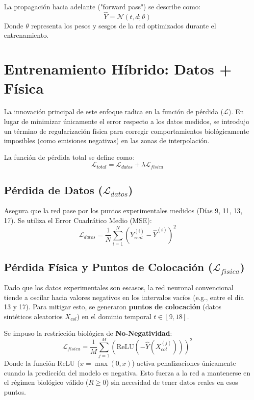 La propagación hacia adelante ("forward pass") se describe como:
\begin{equation}
    \hat{Y} = \mathcal{N}(t, d; \theta)
\end{equation}
Donde $\theta$ representa los pesos y sesgos de la red optimizados durante el entrenamiento.

\section{Entrenamiento Híbrido: Datos + Física}

La innovación principal de este enfoque radica en la función de pérdida ($\mathcal{L}$). En lugar de minimizar únicamente el error respecto a los datos medidos, se introdujo un término de regularización física para corregir comportamientos biológicamente imposibles (como emisiones negativas) en las zonas de interpolación.

La función de pérdida total se define como:
\begin{equation}
    \mathcal{L}_{total} = \mathcal{L}_{datos} + \lambda \mathcal{L}_{fisica}
\end{equation}

\subsection{Pérdida de Datos ($\mathcal{L}_{datos}$)}
Asegura que la red pase por los puntos experimentales medidos (Días 9, 11, 13, 17). Se utiliza el Error Cuadrático Medio (MSE):
\begin{equation}
    \mathcal{L}_{datos} = \frac{1}{N} \sum_{i=1}^{N} (Y_{real}^{(i)} - \hat{Y}^{(i)})^2
\end{equation}

\subsection{Pérdida Física y Puntos de Colocación ($\mathcal{L}_{fisica}$)}
Dado que los datos experimentales son escasos, la red neuronal convencional tiende a oscilar hacia valores negativos en los intervalos vacíos (e.g., entre el día 13 y 17). Para mitigar esto, se generaron \textbf{puntos de colocación} (datos sintéticos aleatorios $X_{col}$) en el dominio temporal $t \in [9, 18]$.

Se impuso la restricción biológica de \textbf{No-Negatividad}:
\begin{equation}
    \mathcal{L}_{fisica} = \frac{1}{M} \sum_{j=1}^{M} \left( \text{ReLU}(-\hat{Y}(X_{col}^{(j)})) \right)^2
\end{equation}
Donde la función ReLU ($x = \max(0, x)$) activa penalizaciones únicamente cuando la predicción del modelo es negativa. Esto fuerza a la red a mantenerse en el régimen biológico válido ($R \ge 0$) sin necesidad de tener datos reales en esos puntos.

